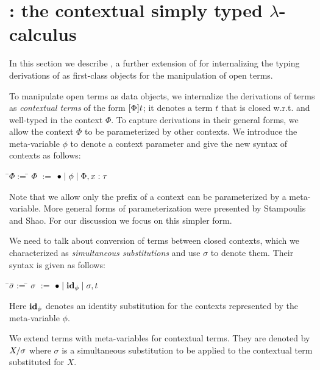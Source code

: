 \documentclass[10pt]{article}
\begin{document}
\section{\STLCC: the contextual simply typed $\lambda$-calculus}
%
In this section we describe \STLCC, a further extension of \STLCE for
internalizing the typing derivations of \STLCE as first-class objects
for the manipulation of open \STLCE terms.

To manipulate open \STLCE terms as data objects, we
internalize the derivations of \STLCE terms as \emph{contextual terms}
of the form $[{\Phi}]{t}$; it denotes a term $t$ that is closed
w.r.t. and well-typed in the context $\Phi$.
%
To capture derivations in their general forms, we allow the context
$\Phi$ to be parameterized by other contexts. We introduce the
meta-variable $\phi$ to denote a context parameter and give the new
syntax of contexts as follows:
%
\begin{tabbing}
\qquad\=$\Phi$\quad\=$:=$\quad\=\kill
\>$\Phi$  \>$:=$ \>$\bullet \; | \; \phi \; | \; \Phi, x:\tau$
\end{tabbing}
%
Note that we allow only the prefix of a context can be parameterized
by a meta-variable. More general forms of parameterization were
presented by Stampoulis and Shao\cite{stampoulis12}. For our
discussion we focus on this simpler form.

We need to talk about conversion of terms between closed contexts,
which we characterized as \emph{simultaneous substitutions} and use
$\sigma$ to denote them. Their syntax is given as follows:
%
\begin{tabbing}
\qquad\=$\sigma$\quad\=$:=$\quad\=\kill
\>$\sigma$  \>$:=$ \>$\bullet \; | \; {\bf id}_{\phi} \; | \; \sigma, t$
\end{tabbing}
%
Here ${\bf id}_{\phi}$ denotes an identity substitution for the contexts
represented by the meta-variable $\phi$.

We extend \STLCE terms with meta-variables for contextual terms. They
are denoted by $X / \sigma$ where $\sigma$ is a simultaneous
substitution to be applied to the contextual term substituted for $X$.
\end{document}
